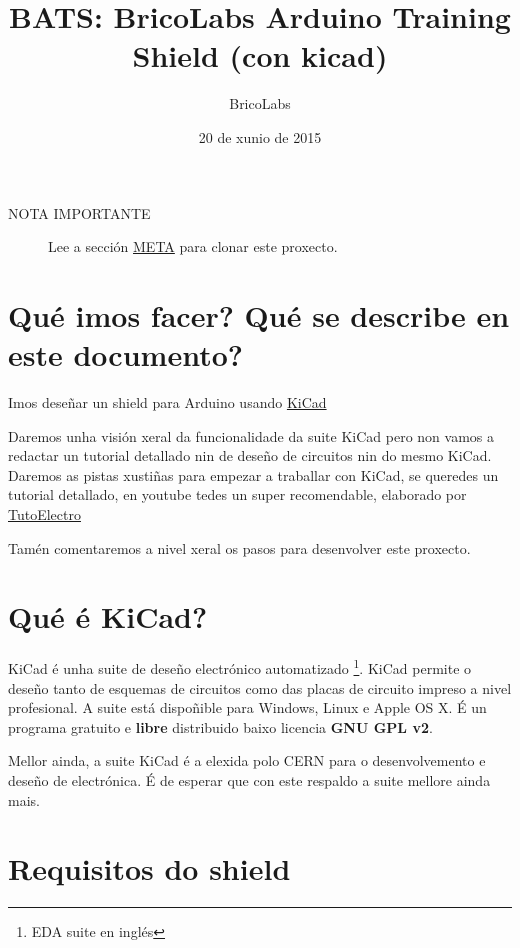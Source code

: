\documentclass[12pt,galician,]{article}
\title{BATS: BricoLabs Arduino Training Shield (con kicad)}
\author{BricoLabs}
\date{20 de xunio de 2015}
\begin{document}
\maketitle

\begin{description}
\item[NOTA IMPORTANTE]
Lee a sección \protect\hyperlink{meta}{META} para clonar este proxecto.
\end{description}

\section{Qué imos facer? Qué se describe en este
documento?}\label{quuxe9-imos-facer-quuxe9-se-describe-en-este-documento}

Imos deseñar un shield para Arduino usando
\href{http://www.kicad-pcb.org/}{KiCad}

Daremos unha visión xeral da funcionalidade da suite KiCad pero non
vamos a redactar un tutorial detallado nin de deseño de circuitos nin do
mesmo KiCad. Daremos as pistas xustiñas para empezar a traballar con
KiCad, se queredes un tutorial detallado, en youtube tedes un super
recomendable, elaborado por
\href{https://www.youtube.com/playlist?list=PL1Hs_F1k2mdRVYDtdWd7tQKDZTfxop7np}{TutoElectro}

Tamén comentaremos a nivel xeral os pasos para desenvolver este
proxecto.

\section{Qué é KiCad?}\label{quuxe9-uxe9-kicad}

KiCad é unha suite de deseño electrónico automatizado \footnote{EDA
  suite en inglés}. KiCad permite o deseño tanto de esquemas de
circuitos como das placas de circuito impreso a nivel profesional. A
suite está dispoñible para Windows, Linux e Apple OS X. É un programa
gratuito e \textbf{libre} distribuido baixo licencia \textbf{GNU GPL
v2}.

Mellor ainda, a suite KiCad é a elexida polo CERN para o desenvolvemento
e deseño de electrónica. É de esperar que con este respaldo a suite
mellore ainda mais.

\section{Requisitos do shield}\label{requisitos-do-shield}
\end{document}

